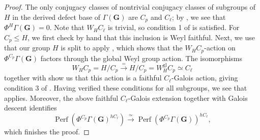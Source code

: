 \documentclass[11pt, a4paper]{article}
\newcommand{\gl}{\mathrm{gl}}
\newcommand{\1}{\mathbf{1}}
\DeclareMathOperator{\Perf}{Perf}
\newcommand{\G}{\mathbf{G}}
\newcommand{\M}{\mathsf{M}}
\newcommand{\Ga}{\Gamma}
\theoremstyle{plain}
\theoremstyle{definition}
\theoremstyle{remark}\numberwithin{equation}{section}
\begin{document}
\begin{proof}
    The only conjugacy classes of nontrivial conjugacy classes of subgroups of $H$ in the derived defect base of $\Ga(\G)$ are $C_p$ and $C_\ell$; by \cite[Pr.5.4.4]{temperedglobal}, we see that $\Phi^{H} \Ga(\G) = 0$. Note that $W_H C_\ell$ is trivial, so condition 1 of  is satisfied. For $C_p \leq H$, we first check by hand that this inclusion is Weyl faithful. Next, we use that our group $H$ is split to apply , which shows that the $W_H C_p$-action on $\Phi^{C_p} \Ga(\G)$ factors through the global Weyl group action. The isomorphisms
    \[W_H C_p = H / C_p \xrightarrow{=} H / C_p = W_H^\gl C_p \simeq C_\ell\]
    together with  show us that this action is a faithful $C_\ell$-Galois action, giving condition 3 of . Having verified these conditions for all subgroups, we see that  applies. Moreover, the above faithful $C_\ell$-Galois extension together with Galois descent identifies
    \[\Perf(\Phi^{C_p} \Ga(\G)^{hC_\ell}) \xrightarrow{\simeq} \Perf(\Phi^{C_p} \Ga(\G))^{hC_\ell},\]
    which finishes the proof.

\end{proof}
\end{document}
